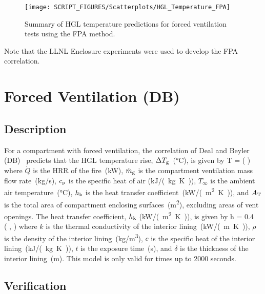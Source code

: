 \begin{figure}[!ht]
\begin{center}
\texttt{[image: SCRIPT\_FIGURES/Scatterplots/HGL\_Temperature\_FPA]}
\end{center}
\caption[Summary of HGL temperature predictions for forced ventilation tests (FPA)]
{Summary of HGL temperature predictions for forced ventilation tests using the FPA method.}
\label{HGL Temperature, Forced Ventilation (FPA)}
\end{figure}

Note that the LLNL Enclosure experiments were used to develop the FPA correlation.


\clearpage


\section{Forced Ventilation (DB)}
\label{sec:DB}

\subsection*{Description}

For a compartment with forced ventilation, the correlation of Deal and Beyler (DB)~\cite{SFPE:Walton} predicts that the HGL temperature rise, $\Delta T\sb{g}$~(\si{\celsius}), is given by
\be
\Delta T = \left(  \right)
\label{eq:DB}
\ee
where $\dot Q$ is the HRR of the fire~(\si{kW}), $\dot m\sb{g}$ is the compartment ventilation mass flow rate~(\si{kg/s}), $c\sb{p}$ is the specific heat of air (\si{kJ/(kg.K)}), $T_\infty$ is the ambient air temperature~(\si{\celsius}), $h\sb{k}$ is the heat transfer coefficient~(\si{kW/(m^2.K)}), and $A\sb{T}$ is the total area of compartment enclosing surfaces~(\si{m^2}), excluding areas of vent openings. The heat transfer coefficient, $h\sb{k}$ (\si{kW/(m^2.K)}), is given by
\be
h = 0.4\  \left(  ,  \right)
\label{eq:DB_hk}
\ee
where $k$ is the thermal conductivity of the interior lining~(\si{kW/(m.K)}), $\rho$ is the density of the interior lining~(\si{kg/m^3}), $c$ is the specific heat of the interior lining~(\si{kJ/(kg.K)}), $t$ is the exposure time~(\si{\second}), and $\delta$ is the thickness of the interior lining~(\si{m}). This model is only valid for times up to 2000 seconds.


\clearpage


\subsection*{Verification}

